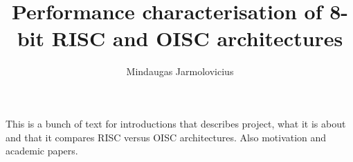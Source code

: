 \documentclass[portrait,color=UCLmidgreen,margin=1.5cm,bannerheight=8cm,logoheight=2.5cm]{uclposter}
\title{Performance characterisation of 8-bit RISC and OISC architectures}
\author{Mindaugas Jarmolovicius}
\begin{document}

\maketitle
{}
\begin{tcolorbox}[title=Introduction]
	
This is a bunch of text for introductions that describes project, what it is about and that it compares RISC versus OISC architectures. Also motivation and academic papers.
\end{tcolorbox}
\end{document}
